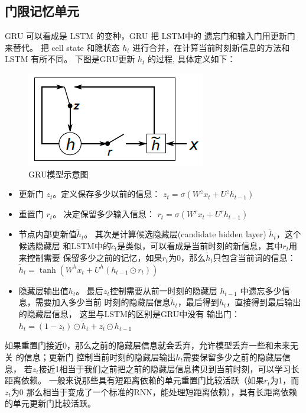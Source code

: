 \subsection{门限记忆单元}
GRU 可以看成是 LSTM 的变种，GRU 把 LSTM中的 遗忘门和输入门用更新门来替代。 把 cell state 和隐状态 $h_t$ 进行合并，在计算当前时刻新信息的方法和 LSTM 有所不同。 下图是GRU更新 $h_t$ 的过程, 具体定义如下：
\begin{figure}[!h]
  \centering
  \includegraphics[width=0.45\linewidth]{./figures/gru.png}
  \caption{GRU模型示意图}\label{fig:gru}
\end{figure}

\begin{itemize}
\item 更新门 $z_t$。定义保存多少以前的信息： $z_t = \sigma ( W^z x_t+ U^z h_{t-1}  )$

\item 重置门 $r_t$。 决定保留多少输入信息： $r_t = \sigma(W^r x_t  + U^r h_{t-1}  )$

\item 节点内部更新值$\tilde h_t $。 其次是计算候选隐藏层(candidate hidden layer) $\tilde h_t$，这个候选隐藏层 和LSTM中的$\tilde c_t$是类似，可以看成是当前时刻的新信息，其中$r_t$用来控制需要 保留多少之前的记忆，如果$r_t$为0，那么$\tilde h_t$只包含当前词的信息：$\tilde h_t  = \tanh (W^h x_t  + U^h(h_{t-1} \odot r_t) )$

\item 隐藏层输出值$h_t$。 最后$z_t$控制需要从前一时刻的隐藏层 $h_{t-1}$ 中遗忘多少信息，需要加入多少当前 时刻的隐藏层信息$\tilde h_t$，最后得到$h_t$，直接得到最后输出的隐藏层信息， 这里与LSTM的区别是GRU中没有 输出门：$h_t = (1-z_t)\odot \tilde h_t  + z_t \odot h_{t-1}$
\end{itemize}

如果重置门接近0，那么之前的隐藏层信息就会丢弃，允许模型丢弃一些和未来无关 的信息；更新门 控制当前时刻的隐藏层输出$h_t$需要保留多少之前的隐藏层信息， 若$z_t$接近1相当于我们之前把之前的隐藏层信息拷贝到当前时刻，可以学习长距离依赖。 一般来说那些具有短距离依赖的单元重置门比较活跃（如果$r_t$为1，而$z_t$为$0$ 那么相当于变成了一个标准的RNN，能处理短距离依赖），具有长距离依赖的单元更新门比较活跃。



